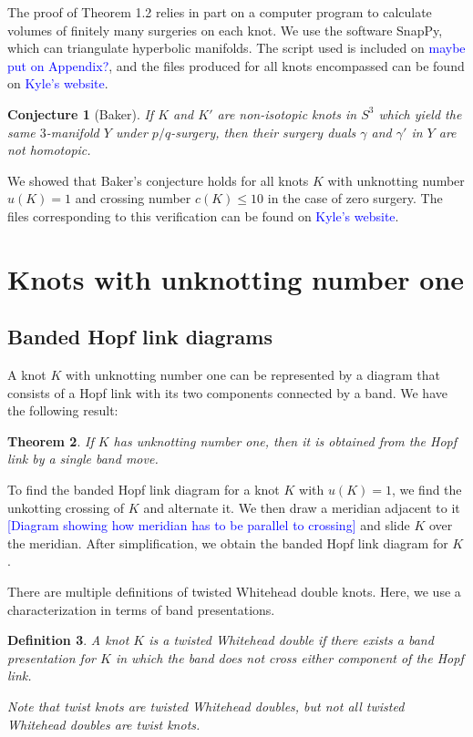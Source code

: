 \documentclass[11pt,usenames,dvipsnames,reqno]{amsart}
\newtheorem{theorem}{Theorem}
\numberwithin{theorem}{section}
\newtheorem{conjecture}[theorem]{Conjecture}
\theoremstyle{ex}
\newtheorem{definition}[theorem]{Definition}
\theoremstyle{rem}
\def\kh#1{\textcolor{Blue}{#1}}
\begin{document}
The proof of Theorem 1.2 relies in part on a computer program to calculate volumes of finitely many surgeries on each knot. We use the software SnapPy, which can triangulate hyperbolic manifolds. The script used is included on \kh{maybe put on Appendix?}, and the files produced for all knots encompassed can be found on \kh{Kyle's website}.

\begin{conjecture}[Baker] If $K$ and $K'$ are non-isotopic knots in $S^3$ which yield the same $3$-manifold $Y$ under $p/q$-surgery, then their surgery duals $\gamma$ and $\gamma'$ in $Y$ are not homotopic.
\end{conjecture}

We showed that Baker's conjecture holds for all knots $K$ with unknotting number $u(K) = 1$ and crossing number $c(K) \leq 10$ in the case of zero surgery. The files corresponding to this verification can be found on \kh{Kyle's website}.


\section{Knots with unknotting number one}\label{sec:unknotting-one}


\subsection{Banded Hopf link diagrams}\label{band} A knot $K$ with unknotting number one can be represented by a diagram that consists of a Hopf link with its two components connected by a band. We have the following result:

\begin {theorem} If $K$ has unknotting number one, then it is obtained from the Hopf link by a single band move.
\end{theorem}

To find the banded Hopf link diagram for a knot $K$ with $u(K) =1$, we find the unkotting crossing of $K$ and alternate it. We then draw a meridian adjacent to it \kh{[Diagram showing how meridian has to be parallel to crossing]} and slide $K$ over the meridian. After simplification, we obtain the banded Hopf link diagram for $K$. 

There are multiple definitions of twisted Whitehead double knots. Here, we use a characterization in terms of band presentations.

\begin{definition} A knot $K$ is a \textit{twisted Whitehead double} if there exists a band presentation for $K$ in which the band does not cross either component of the Hopf link.
	
Note that twist knots are twisted Whitehead doubles, but not all twisted Whitehead doubles are twist knots.

\end{definition}
\end{document}
